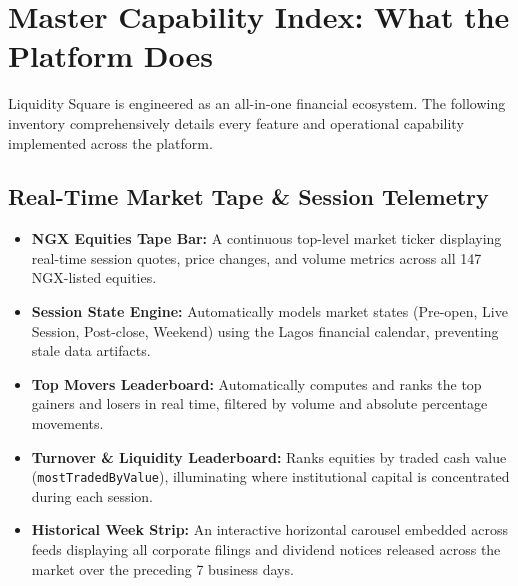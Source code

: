 \documentclass[11pt,a4paper]{article}
\begin{document}
\section{Master Capability Index: What the Platform Does}

Liquidity Square is engineered as an all-in-one financial ecosystem. The following inventory comprehensively details every feature and operational capability implemented across the platform.

\subsection{Real-Time Market Tape \& Session Telemetry}
\begin{itemize}
    \item \textbf{NGX Equities Tape Bar:} A continuous top-level market ticker displaying real-time session quotes, price changes, and volume metrics across all 147 NGX-listed equities.
    \item \textbf{Session State Engine:} Automatically models market states (Pre-open, Live Session, Post-close, Weekend) using the Lagos financial calendar, preventing stale data artifacts.
    \item \textbf{Top Movers Leaderboard:} Automatically computes and ranks the top gainers and losers in real time, filtered by volume and absolute percentage movements.
    \item \textbf{Turnover \& Liquidity Leaderboard:} Ranks equities by traded cash value (\texttt{mostTradedByValue}), illuminating where institutional capital is concentrated during each session.
    \item \textbf{Historical Week Strip:} An interactive horizontal carousel embedded across feeds displaying all corporate filings and dividend notices released across the market over the preceding 7 business days.
\end{itemize}
\end{document}

